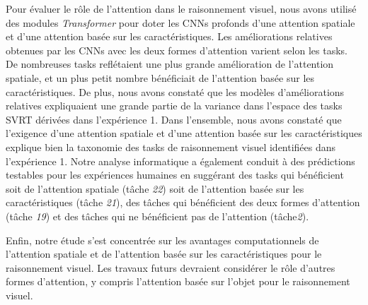 Pour \'evaluer le rôle de l'attention dans le raisonnement visuel, nous avons utilis\'e des modules \textit{Transformer} pour doter les CNNs profonds d'une attention spatiale et d'une attention bas\'ee sur les caract\'eristiques. Les am\'eliorations relatives obtenues par les CNNs avec les deux formes d'attention varient selon les tasks. De nombreuses tasks refl\'etaient une plus grande am\'elioration de l'attention spatiale, et un plus petit nombre b\'en\'eficiait de l'attention bas\'ee sur les caract\'eristiques. De plus, nous avons constat\'e que les mod\`eles d'am\'eliorations relatives expliquaient une grande partie de la variance dans l'espace des tasks SVRT d\'eriv\'ees dans l'exp\'erience 1. Dans l'ensemble, nous avons constat\'e que l'exigence d'une attention spatiale et d'une attention bas\'ee sur les caract\'eristiques explique bien la taxonomie des tasks de raisonnement visuel identifi\'ees dans l'exp\'erience 1.  Notre analyse informatique a \'egalement conduit \`a des pr\'edictions testables pour les exp\'eriences humaines en sugg\'erant des tasks qui b\'en\'eficient soit de l'attention spatiale (tâche \textit{22}) soit de l'attention bas\'ee sur les caract\'eristiques (tâche \textit{21}), des tâches qui b\'en\'eficient des deux formes d'attention (tâche \textit{19}) et des tâches qui ne b\'en\'eficient pas de l'attention (tâche\textit{2}).


\color{black}
Enfin, notre \'etude s'est concentr\'ee sur les avantages computationnels de l'attention spatiale et de l'attention bas\'ee sur les caract\'eristiques pour le raisonnement visuel. Les travaux futurs devraient consid\'erer le rôle d'autres formes d'attention, y compris l'attention bas\'ee sur l'objet \citep{egly1994covert} pour le raisonnement visuel.

